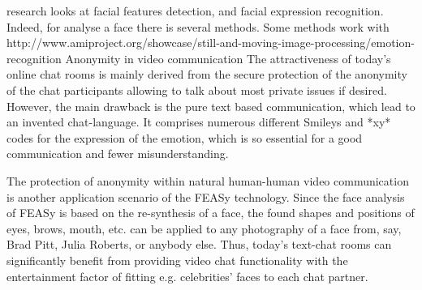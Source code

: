  research looks at facial features detection, and facial expression recognition. Indeed, for analyse a face there is several methods. Some methods work with 
http://www.amiproject.org/showcase/still-and-moving-image-processing/emotion-recognition
Anonymity in video communication
The attractiveness of today's online chat rooms is mainly derived from the secure protection of the anonymity of the chat participants allowing to talk about most private issues if desired. However, the main drawback is the pure text based communication, which lead to an invented chat-language. It comprises numerous different Smileys and *xy* codes for the expression of the emotion, which is so essential for a good communication and fewer misunderstanding.

The protection of anonymity within natural human-human video communication is another application scenario of the FEASy technology. Since the face analysis of FEASy is based on the re-synthesis of a face, the found shapes and positions of eyes, brows, mouth, etc. can be applied to any photography of a face from, say, Brad Pitt, Julia Roberts, or anybody else. Thus, today's text-chat rooms can significantly benefit from providing video chat functionality with the entertainment factor of fitting e.g. celebrities' faces to each chat partner.
